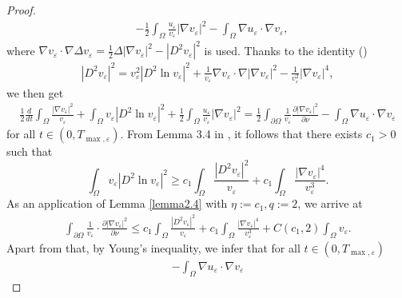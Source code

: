 \documentclass[12pt]{article}
\theoremstyle{plain}
\theoremstyle{definition}
\numberwithin{equation}{section}
\begin{document}
\begin{proof}
\begin{align*}
 &-\frac{1}{2} \int_{\Omega} \frac{u_{\varepsilon}}{v_{\varepsilon}}\left|\nabla v_{\varepsilon}\right|^2
    -\int_{\Omega} \nabla u_{\varepsilon} \cdot \nabla v_{\varepsilon},
\end{align*}
 where  $\nabla v_{\varepsilon} \cdot \nabla \Delta
v_{\varepsilon}=\frac{1}{2}\Delta|\nabla v_{\varepsilon}|^2-|D^2 v_{\varepsilon}|^2$ is used. Thanks to the identity (\cite[Lemma 3.2]{WDCDSB})
 \begin{align}\label{2.20}
    |D^2 v_{\varepsilon}|^2=v_{\varepsilon}^2|D^2 \ln v_{\varepsilon}|^2+\frac{1}{v_{\varepsilon}}\nabla v_{\varepsilon}\cdot\nabla|\nabla
    v_{\varepsilon}|^2-\frac{1}{v_{\varepsilon}^2}|\nabla v_{\varepsilon}|^4,
    \end{align}
we then  get
\begin{align}\label{2.21}
\frac{1}{2} \frac{d}{dt}\int_{\Omega} \frac{\left|\nabla v_{\varepsilon}\right|^2}{v_{\varepsilon}}
  +\int_{\Omega} v_{\varepsilon}\left|D^2 \ln v_{\varepsilon}\right|^2
    +\frac{1}{2} \int_{\Omega} \frac{u_{\varepsilon}}{v_{\varepsilon}}\left|\nabla v_{\varepsilon}\right|^2
   =  \frac{1}{2} \int_{\partial \Omega} \frac{1}{v_{\varepsilon}} \frac{\partial|\nabla v_{\varepsilon}|^2}{\partial \nu}
    -\int_{\Omega} \nabla u_{\varepsilon} \cdot \nabla v_{\varepsilon}
\end{align}
for all $t \in\left(0, T_{\max, \varepsilon}\right)$. From Lemma 3.4 in \cite{WDCDSB}, it follows that there
exists  $c_1>0$ such that
\begin{equation}\label{2.22}
\int_{\Omega} v_{\varepsilon}\left|D^2 \ln v_{\varepsilon}\right|^2
\geq c_1 \int_{\Omega} \frac{\left|D^2 v_{\varepsilon}\right|^2}{v_{\varepsilon}}
  +c_1 \int_{\Omega} \frac{\left|\nabla v_{\varepsilon}\right|^4}{v_{\varepsilon}^3}.
\end{equation}
As an application of Lemma \ref{lemma2.4} with $\eta:=c_1, q:=2$, we arrive at
\begin{align}\label{2.23}
 \int_{\partial \Omega} \frac{1}{v_{\varepsilon}} \cdot \frac{\partial\left|\nabla v_{\varepsilon}\right|^2}{\partial \nu}
\leq c_1
\int_{\Omega} \frac{\left|D^2 v_{\varepsilon}\right|^2}{v_{\varepsilon}}
  +c_1 \int_{\Omega} \frac{\left|\nabla v_{\varepsilon}\right|^4}{v_{\varepsilon}^3}
  +C(c_1,2) \int_{\Omega} v_{\varepsilon}.
\end{align}
Apart from that, by Young's inequality, we infer that for all $t
\in\left(0, T_{\max, \varepsilon}\right)$
\begin{align}\label{2.24}
-\int_{\Omega} \nabla u_{\varepsilon} \cdot \nabla v_{\varepsilon}

\end{align}
\end{proof}
\end{document}
